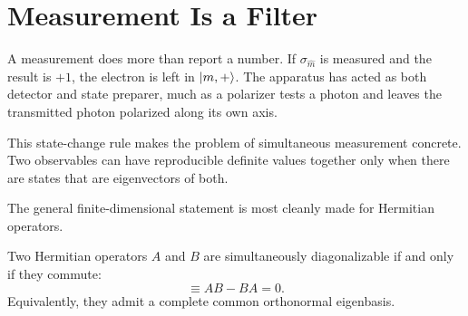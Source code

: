 \begin{classroomqa}
\end{classroomqa}

\section{Measurement Is a Filter}

A measurement does more than report a number. If \(\sigma_{\hat m}\) is measured and the result is \(+1\), the electron is left in \(\left\lvert m,+\right\rangle\). The apparatus has acted as both detector and state preparer, much as a polarizer tests a photon and leaves the transmitted photon polarized along its own axis.

This state-change rule makes the problem of simultaneous measurement concrete. Two observables can have reproducible definite values together only when there are states that are eigenvectors of both.

\begin{classroomqa}
\end{classroomqa}

The general finite-dimensional statement is most cleanly made for Hermitian operators.

\begin{theorem}
Two Hermitian operators \(A\) and \(B\) are simultaneously diagonalizable if and only if they commute:
\begin{equation}
  [A,B]\equiv AB-BA=0.
  \label{eq:l04-commutator}
\end{equation}
Equivalently, they admit a complete common orthonormal eigenbasis.
\end{theorem}

